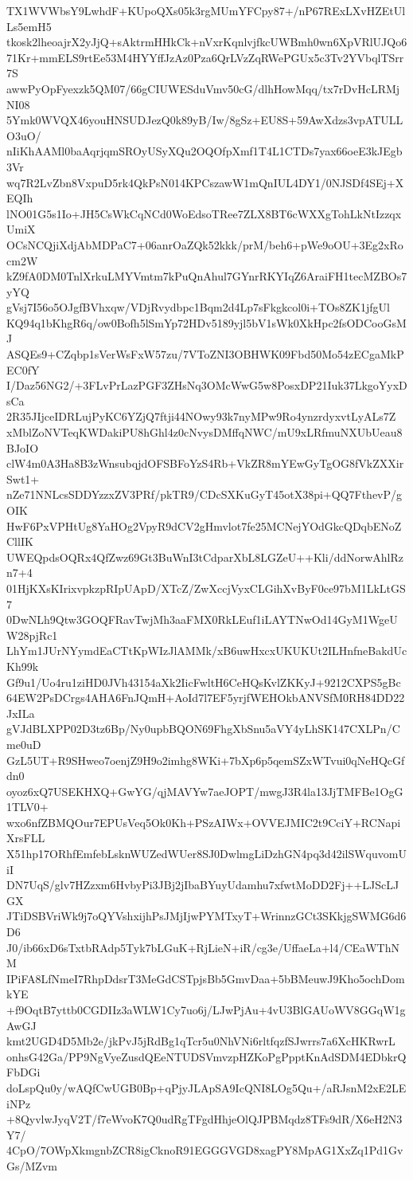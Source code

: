 TX1WVWbsY9LwhdF+KUpoQXs05k3rgMUmYFCpy87+/nP67RExLXvHZEtUlLs5emH5
tkosk2lheoajrX2yJjQ+sAktrmHHkCk+nVxrKqnlvjfkcUWBmh0wn6XpVRlUJQo6
71Kr+mmELS9rtEe53M4HYYffJzAz0Pza6QrLVzZqRWePGUx5c3Tv2YVbqlTSrr7S
awwPyOpFyexzk5QM07/66gCIUWESduVmv50cG/dlhHowMqq/tx7rDvHcLRMjNI08
5Ymk0WVQX46youHNSUDJezQ0k89yB/Iw/8gSz+EU8S+59AwXdzs3vpATULLO3uO/
nIiKhAAMl0baAqrjqmSROyUSyXQu2OQOfpXmf1T4L1CTDs7yax66oeE3kJEgb3Vr
wq7R2LvZbn8VxpuD5rk4QkPsN014KPCszawW1mQnIUL4DY1/0NJSDf4SEj+XEQIh
lNO01G5s1Io+JH5CsWkCqNCd0WoEdsoTRee7ZLX8BT6cWXXgTohLkNtIzzqxUmiX
OCsNCQjiXdjAbMDPaC7+06anrOaZQk52kkk/prM/beh6+pWe9oOU+3Eg2xRocm2W
kZ9fA0DM0TnlXrkuLMYVmtm7kPuQnAhul7GYnrRKYIqZ6AraiFH1tecMZBOs7yYQ
gVsj7I56o5OJgfBVhxqw/VDjRvydbpc1Bqm2d4Lp7sFkgkcol0i+TOs8ZK1jfgUl
KQ94q1bKhgR6q/ow0Bofh5lSmYp72HDv5189yjl5bV1sWk0XkHpc2fsODCooGsMJ
ASQEs9+CZqbp1sVerWsFxW57zu/7VToZNI3OBHWK09Fbd50Mo54zECgaMkPEC0fY
I/Daz56NG2/+3FLvPrLazPGF3ZHsNq3OMcWwG5w8PosxDP21Iuk37LkgoYyxDsCa
2R35JIjceIDRLujPyKC6YZjQ7ftji44NOwy93k7nyMPw9Ro4ynzrdyxvtLyALs7Z
xMblZoNVTeqKWDakiPU8hGhl4z0cNvysDMffqNWC/mU9xLRfmuNXUbUeau8BJoIO
clW4m0A3Ha8B3zWnsubqjdOFSBFoYzS4Rb+VkZR8mYEwGyTgOG8fVkZXXirSwt1+
nZe71NNLcsSDDYzzxZV3PRf/pkTR9/CDcSXKuGyT45otX38pi+QQ7FthevP/gOIK
HwF6PxVPHtUg8YaHOg2VpyR9dCV2gHmvlot7fe25MCNejYOdGkcQDqbENoZCllIK
UWEQpdsOQRx4QfZwz69Gt3BuWnI3tCdparXbL8LGZeU++Kli/ddNorwAhlRzn7+4
01HjKXsKIrixvpkzpRIpUApD/XTcZ/ZwXccjVyxCLGihXvByF0ce97bM1LkLtGS7
0DwNLh9Qtw3GOQFRavTwjMh3aaFMX0RkLEuf1iLAYTNwOd14GyM1WgeUW28pjRc1
LhYm1JUrNYymdEaCTtKpWIzJlAMMk/xB6uwHxcxUKUKUt2ILHnfneBakdUcKh99k
Gf9u1/Uo4ru1ziHD0JVh43154aXk2IicFwltH6CeHQsKvlZKKyJ+9212CXPS5gBc
64EW2PsDCrgs4AHA6FnJQmH+AoId7l7EF5yrjfWEHOkbANVSfM0RH84DD22JxILa
gVJdBLXPP02D3tz6Bp/Ny0upbBQON69FhgXbSnu5aVY4yLhSK147CXLPn/Cme0uD
GzL5UT+R9SHweo7oenjZ9H9o2imhg8WKi+7bXp6p5qemSZxWTvui0qNeHQcGfdn0
oyoz6xQ7USEKHXQ+GwYG/qjMAVYw7aeJOPT/mwgJ3R4la13JjTMFBe1OgG1TLV0+
wxo6nfZBMQOur7EPUsVeq5Ok0Kh+PSzAIWx+OVVEJMIC2t9CciY+RCNapiXrsFLL
X51hp17ORhfEmfebLsknWUZedWUer8SJ0DwlmgLiDzhGN4pq3d42ilSWquvomUiI
DN7UqS/glv7HZzxm6HvbyPi3JBj2jIbaBYuyUdamhu7xfwtMoDD2Fj++LJScLJGX
JTiDSBVriWk9j7oQYVshxijhPsJMjIjwPYMTxyT+WrinnzGCt3SKkjgSWMG6d6D6
J0/ib66xD6sTxtbRAdp5Tyk7bLGuK+RjLieN+iR/cg3e/UffaeLa+l4/CEaWThNM
IPiFA8LfNmeI7RhpDdsrT3MeGdCSTpjsBb5GmvDaa+5bBMeuwJ9Kho5ochDomkYE
+f9OqtB7yttb0CGDIIz3aWLW1Cy7uo6j/LJwPjAu+4vU3BlGAUoWV8GGqW1gAwGJ
kmt2UGD4D5Mb2e/jkPvJ5jRdBg1qTcr5u0NhVNi6rltfqzfSJwrrs7a6XcHKRwrL
onhsG42Ga/PP9NgVyeZusdQEeNTUDSVmvzpHZKoPgPpptKnAdSDM4EDbkrQFbDGi
doLspQu0y/wAQfCwUGB0Bp+qPjyJLApSA9IcQNI8LOg5Qu+/aRJsnM2xE2LEiNPz
+8QyvlwJyqV2T/f7eWvoK7Q0udRgTFgdHhjeOlQJPBMqdz8TFs9dR/X6eH2N3Y7/
4CpO/7OWpXkmgnbZCR8igCknoR91EGGGVGD8xagPY8MpAG1XxZq1Pd1GvGs/MZvm
